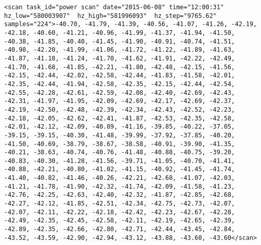 \begin{lstlisting}
<scan task_id="power scan" date="2015-06-08" time="12:00:31" hz_low="580003907"  hz_high="581996093"  hz_step="9765.62" samples="224">-40.70, -41.79, -41.39, -40.56, -41.07, -41.26, -42.19, -42.18, -40.60, -41.21, -40.96, -41.99, -41.37, -41.94, -41.50, -40.38, -41.85, -40.40, -41.45, -41.90, -40.91, -40.74, -41.51, -40.98, -42.20, -41.99, -41.06, -41.72, -41.22, -41.89, -41.63, -41.87, -41.18, -41.24, -41.70, -41.62, -41.91, -42.22, -42.49, -41.70, -41.68, -41.85, -42.21, -41.80, -42.48, -42.15, -41.56, -42.15, -42.44, -42.02, -42.58, -42.44, -41.83, -41.58, -42.01, -42.35, -42.44, -41.94, -42.58, -42.35, -42.15, -42.44, -42.54, -42.55, -42.28, -42.61, -42.59, -42.08, -42.40, -42.69, -42.43, -42.31, -41.97, -41.95, -42.09, -42.69, -42.17, -42.69, -42.37, -42.19, -42.50, -42.48, -42.39, -42.34, -42.43, -42.52, -42.23, -42.18, -42.05, -42.62, -42.41, -41.87, -42.53, -42.35, -42.58, -42.01, -42.12, -42.09, -40.89, -41.16, -39.85, -40.22, -37.05, -39.15, -39.15, -40.30, -41.48, -39.99, -37.92, -37.85, -40.20, -41.50, -40.69, -38.79, -38.67, -38.58, -40.91, -39.90, -41.35, -40.21, -38.63, -40.74, -40.76, -41.48, -40.88, -40.75, -39.20, -40.83, -40.30, -41.28, -41.56, -39.71, -41.05, -40.70, -41.41, -40.88, -42.21, -40.80, -41.02, -41.15, -40.92, -41.45, -41.74, -41.40, -40.82, -41.46, -40.26, -42.21, -42.68, -41.07, -42.03, -41.21, -41.78, -41.90, -42.32, -41.74, -42.09, -41.58, -41.23, -42.76, -42.25, -42.63, -42.40, -42.32, -41.87, -42.85, -42.68, -42.27, -42.12, -41.85, -42.51, -42.34, -42.75, -42.73, -42.07, -42.07, -42.11, -42.22, -42.18, -42.42, -42.23, -42.67, -42.28, -42.49, -42.35, -42.45, -42.58, -42.11, -42.19, -42.65, -42.39, -42.89, -42.35, -42.66, -42.80, -42.71, -42.44, -43.45, -42.84, -43.52, -43.59, -42.90, -42.94, -43.12, -43.88, -43.60, -43.60</scan>

\end{lstlisting}
